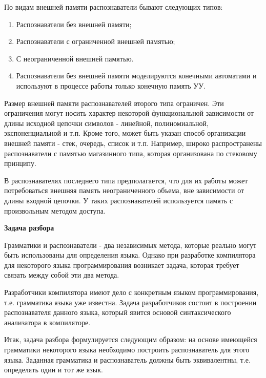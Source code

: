   По видам внешней памяти распознаватели бывают следующих типов:

  \begin{enumerate}
    \item Распознаватели без внешней памяти;
    \item Распознаватели с ограниченной внешней памятью;
    \item С неограниченной внешней памятью.
    \item Распознаватели без внешней памяти моделируются конечными автоматами и используют в процессе работы только конечную память УУ.
  \end{enumerate}

  Размер внешней памяти распознавателей второго типа ограничен. Эти ограничения могут носить характер некоторой функциональной зависимости от длины исходной цепочки символов - линейной, полиномиальной, экспоненциальной и т.п. Кроме того, может быть указан способ организации внешней памяти - стек, очередь, список и т.п. Например, широко распространены распознаватели с памятью магазинного типа, которая организована по стековому принципу.

  В распознавателях последнего типа предполагается, что для их работы может потребоваться внешняя память неограниченного объема, вне зависимости от длины входной цепочки. У таких распознавателей используется память с произвольным методом доступа.

  \begin{center}{\bfseries Задача разбора}
  \end{center}

  \begin{utv}
    Грамматики и распознаватели - два независимых метода, которые реально могут быть использованы для определения языка. Однако при разработке компилятора для некоторого языка программирования возникает задача, которая требует связать между собой эти два метода.
  \end{utv}

  Разработчики компилятора имеют дело с конкретным языком программирования, т.е. грамматика языка уже известна. Задача разработчиков состоит в построении распознавателя данного языка, который явится основой синтаксического анализатора в компиляторе.

  Итак, задача разбора формулируется следующим образом: на основе имеющейся грамматики некоторого языка необходимо построить распознаватель для этого языка. Заданная грамматика и распознаватель должны быть эквивалентны, т.е. определять один и тот же язык.

